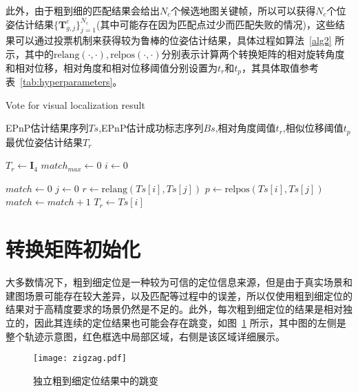 此外，由于粗到细的匹配结果会给出$N_c$个候选地图关键帧，所以可以获得$N_c$个位姿估计结果$\{ \symbf{T}^{c}_{g,j} \}^{N_c}_{j=1}$(其中可能存在因为匹配点过少而匹配失败的情况)，这些结果可以通过投票机制来获得较为鲁棒的位姿估计结果，具体过程如算法~\ref{alg2} 所示，其中的$\text{relang}(\cdot, \cdot),\text{relpos}(\cdot, \cdot)$分别表示计算两个转换矩阵的相对旋转角度和相对位移，相对角度和相对位移阈值分别设置为$t_r$和$t_p$，其具体取值参考表~\ref{tab:hyperparameters}。

\renewcommand{\algorithmicrequire}{\textbf{输入：}\unskip}
\renewcommand{\algorithmicensure}{\textbf{输出：}\unskip}
\begin{algorithm}
  \caption{Vote for visual localization result}
  \label{alg2}
  \small
  \begin{algorithmic}[1]
    \REQUIRE EPnP估计结果序列$Ts$,EPnP估计成功标志序列$Bs$,相对角度阈值$t_r$,相似位移阈值$t_p$
    \ENSURE 最优位姿估计结果$T_{r}$

    \STATE $T_{r} \leftarrow \symbf{I}_4$
    \STATE ${match}_{max} \leftarrow 0$
    \STATE $i \leftarrow 0$

      \STATE $match \leftarrow 0$
        \STATE $j \leftarrow 0$
          \STATE $r \leftarrow \text{relang}(Ts[i], Ts[j])$
          \STATE $p \leftarrow \text{relpos}(Ts[i], Ts[j])$
            \STATE $match \leftarrow match + 1$
          \ENDIF
        \ENDWHILE
          \STATE $T_{r} \leftarrow Ts[i]$
        \ENDIF
      \ENDIF
    \ENDWHILE
  \end{algorithmic}
\end{algorithm}

\section{转换矩阵初始化}

大多数情况下，粗到细定位是一种较为可信的定位信息来源，但是由于真实场景和建图场景可能存在较大差异，以及匹配等过程中的误差，所以仅使用粗到细定位的结果对于高精度要求的场景仍然是不足的。此外，每次粗到细定位的结果是相对独立的，因此其连续的定位结果也可能会存在跳变，如图~\ref{fig:zigzag} 所示，其中图的左侧是整个轨迹示意图，红色框选中局部区域，右侧是该区域详细展示。

\begin{figure}
  \centering
  \texttt{[image: zigzag.pdf]}
  \caption{独立粗到细定位结果中的跳变}
  \label{fig:zigzag}
\end{figure}

